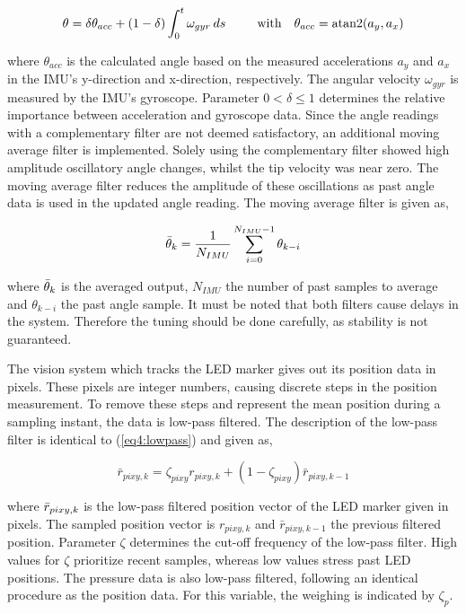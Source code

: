 \begin{equation}
    \theta = \delta \theta_{acc} + (1-\delta) \int_0^t \omega_{gyr} \hspace{2pt} ds    \hspace{25pt} \text{with}  \hspace{10pt} \theta_{acc} = \operatorname{atan2}(a_y,a_x)
\end{equation}

where $\theta_{acc}$ is the calculated angle based on the measured accelerations $a_y$ and $a_x$ in the IMU's y-direction and x-direction, respectively. The angular velocity $\omega_{gyr}$ is measured by the IMU's gyroscope. Parameter $0 < \delta \leq 1$ determines the relative importance between acceleration and gyroscope data. Since the angle readings with a complementary filter are not deemed satisfactory, an additional moving average filter is implemented. Solely using the complementary filter showed high amplitude oscillatory angle changes, whilst the tip velocity was near zero. The moving average filter reduces the amplitude of these oscillations as past angle data is used in the updated angle reading. The moving average filter is given as,

\begin{equation}
    \Bar{\theta}_k = \frac{1}{N_{IMU}}\sum_{i = 0} ^ {N_{IMU}-1} \theta_{k-i}
\end{equation}

where $\Bar{\theta}_k$ is the averaged output, $N_{IMU}$ the number of past samples to average and $\theta_{k-i}$ the past angle sample. It must be noted that both filters cause delays in the system. Therefore the tuning should be done carefully, as stability is not guaranteed.

The vision system which tracks the LED marker gives out its position data in pixels. These pixels are integer numbers, causing discrete steps in the position measurement. To remove these steps and represent the mean position during a sampling instant, the data is low-pass filtered. The description of the low-pass filter is identical to (\ref{eq4:lowpass}) and given as,

\begin{equation}
\bar{r}_{pixy,k} = \zeta_{pixy} r_{pixy,k} + (1-\zeta_{pixy})\bar{r}_{pixy,k-1}
\label{eq5:lowpass}
\end{equation}

where $\Bar{r}_{pixy,k}$ is the low-pass filtered position vector of the LED marker given in pixels. The sampled position vector is $r_{pixy,k}$ and $\bar{r}_{pixy,k-1}$ the previous filtered position. Parameter $\zeta$ determines the cut-off frequency of the low-pass filter. High values for $\zeta$ prioritize recent samples, whereas low values stress past LED positions. The pressure data is also low-pass filtered, following an identical procedure as the position data. For this variable, the weighing is indicated by $\zeta_p$. 





